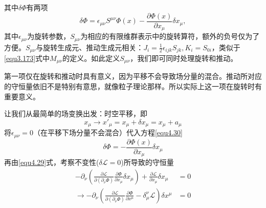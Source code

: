 其中$\delta\Phi$有两项
\begin{equation}
\delta\Phi = \epsilon_{\mu\nu}S^{\mu\nu}\Phi(x)-\frac{\partial\Phi(x)}{\partial x_\mu}\delta x_\mu ,
\label{equ4.30}
\end{equation}
其中$\epsilon_{\mu\nu}$为旋转参数，$S_{\mu\nu}$为相应的有限维群表示中的旋转算符，额外的负号仅为了方便。$S_{\mu\nu}$与旋转生成元、推动生成元相关：$J_{i}=\frac{1}{2}\epsilon_{ijk}S_{jk}, K_i=S_{0i}$，类似于\eqref{equ3.173}式中$M_{\mu\nu}$的定义。如此定义$S_{\mu\nu}$，我们即可同时处理旋转和推动。

第一项仅在旋转和推动时具有意义，因为平移不会导致场分量的混合。推动所对应的守恒量依旧不是特别有意思，就像粒子理论那样。所以实际上这一项在旋转时有重要意义。

让我们从最简单的场变换出发：时空平移，即
\begin{equation}
x_\mu \rightarrow x'_\mu = x_\mu + \delta x_\mu = x_\mu + a_\mu
\label{equ4.31}
\end{equation}
将$\epsilon_{\mu\nu}=0$（在平移下场分量不会混合）代入方程\eqref{equ4.30}
\[
\delta\Phi = -\frac{\partial\Phi(x)}{\partial x_\mu}\delta x_\mu
\]
再由\eqref{equ4.29}式，考察不变性($\delta{\mathscr L}=0$)所导致的守恒量
\begin{eqnarray}
-\partial_\nu\left(\frac{\partial\mathscr L}{\partial(\partial_\nu \Phi)}\frac{\partial\Phi}{\partial x_\mu}\delta x_\mu\right) + \frac{\partial\mathscr L}{\partial x_\mu}\delta x_\mu &= 0 \label{equ4.32} \\
\rightarrow -\partial_\nu\left(\frac{\partial\mathscr L}{\partial(\partial_\nu \Phi)}\frac{\partial\Phi}{\partial x^\mu} - \delta_\mu^\nu{\mathscr L}\right) \delta x^\mu &= 0 \label{equ4.33}
\end{eqnarray}

